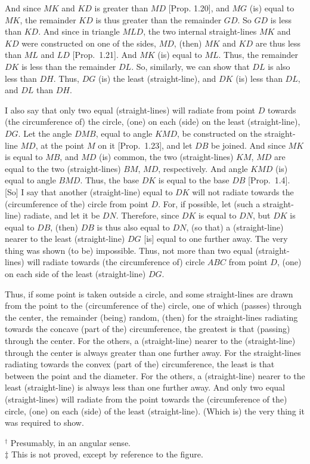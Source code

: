 \begin{Parallel}{}{}
{And since $MK$ and $KD$ is greater than $MD$ [Prop. 1.20], and $MG$ (is)
equal to $MK$, the remainder $KD$ is thus greater than the remainder $GD$.
So $GD$ is less than $KD$. And since in triangle $MLD$, the two internal straight-lines
$MK$ and $KD$ were constructed on one of the sides, $MD$, (then) $MK$ and $KD$
are thus less than $ML$ and $LD$  [Prop.~1.21]. And $MK$ (is) equal to $ML$.
Thus, the remainder $DK$ is less than the remainder $DL$. So, similarly, we
can show that $DL$ is also less than $DH$. Thus, $DG$ (is) the least (straight-line),
and $DK$ (is) less than $DL$, and $DL$ than $DH$.

\epsfysize=2.5in
\centerline{}

I also say that only two equal (straight-lines) will radiate from point $D$ towards (the
circumference of) the circle, (one) on each (side) on the least (straight-line),
$DG$. Let the  angle $DMB$, equal to angle $KMD$, be constructed
on the straight-line $MD$, at the point $M$ on it [Prop.~1.23], and  let $DB$ be
joined. And since $MK$ is equal to $MB$, and $MD$ (is) common, the
two (straight-lines) $KM$, $MD$ are equal to the two (straight-lines) $BM$, $MD$,
respectively. And angle $KMD$ (is) equal to angle $BMD$. Thus, the base
$DK$ is equal to the base $DB$ [Prop.~1.4]. [So] I say that another (straight-line)
equal to $DK$ will not radiate towards the (circumference of the) circle
from point $D$. For, if possible, let (such a straight-line) radiate, and let
it be $DN$. Therefore, since $DK$ is equal to $DN$, but $DK$ is equal to $DB$, (then) $DB$
is thus also equal to $DN$, (so that) a (straight-line) nearer to the least (straight-line) $DG$ [is]
equal to one further away. The very thing was shown (to be)  impossible. 
Thus, not more than two equal (straight-lines) will radiate towards
(the circumference of) circle $ABC$ from point $D$, (one) on each side
of the least (straight-line) $DG$.

Thus, if some point is taken outside a circle, and some straight-lines are
drawn from the point to the (circumference of the) circle, one of which (passes) through the
center, the remainder  (being) random, (then) for the straight-lines
radiating towards the concave (part of the) circumference, the
greatest is  that (passing) through the center. For the others, a (straight-line)
nearer to the (straight-line) through the center is always greater than one
further away. For the straight-lines radiating towards the convex (part of
the) circumference, the least is that between the point and the
diameter. For the others, a (straight-line) nearer to the least
(straight-line) is always less than one further away. And only
two equal (straight-lines) will radiate from the point towards the (circumference of the) circle, (one) on each (side)
of the least (straight-line).  (Which is) the very thing it was required to show.}
\end{Parallel}
{\footnotesize \noindent$^\dag$ Presumably, in an angular sense.\\
$\ddag$  This is not
proved, except by reference to the figure.} 

